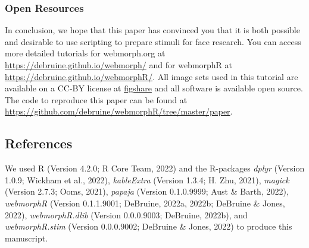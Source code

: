 \documentclass[
  doc,floatsintext]{apa6}
\begin{document}
\hypertarget{open-resources}{%
\subsubsection{Open Resources}\label{open-resources}}

In conclusion, we hope that this paper has convinced you that it is both possible and desirable to use scripting to prepare stimuli for face research. You can access more detailed tutorials for webmorph.org at \url{https://debruine.github.io/webmorph/} and for webmorphR at \url{https://debruine.github.io/webmorphR/}. All image sets used in this tutorial are available on a CC-BY license at \href{https://figshare.com/search?q=webmorph\%20psychomorph}{figshare} and all software is available open source. The code to reproduce this paper can be found at \url{https://github.com/debruine/webmorphR/tree/master/paper}.

\newpage

\hypertarget{references}{%
\subsection{References}\label{references}}

We used R (Version 4.2.0; R Core Team, 2022) and the R-packages \emph{dplyr} (Version 1.0.9; Wickham et al., 2022), \emph{kableExtra} (Version 1.3.4; H. Zhu, 2021), \emph{magick} (Version 2.7.3; Ooms, 2021), \emph{papaja} (Version 0.1.0.9999; Aust \& Barth, 2022), \emph{webmorphR} (Version 0.1.1.9001; DeBruine, 2022a, 2022b; DeBruine \& Jones, 2022), \emph{webmorphR.dlib} (Version 0.0.0.9003; DeBruine, 2022b), and \emph{webmorphR.stim} (Version 0.0.0.9002; DeBruine \& Jones, 2022) to produce this manuscript.

\begingroup
\setlength{\parindent}{-0.5in}
\setlength{\leftskip}{0.5in}
\end{document}
